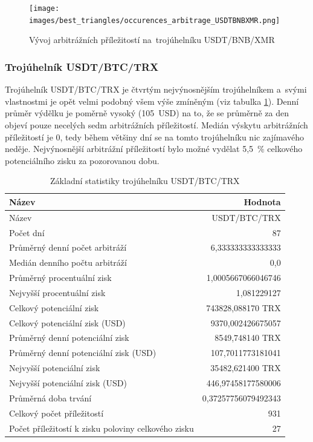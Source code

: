 \documentclass[thesis=B,czech]{FITthesis}[2019/03/21]
\begin{document}
\begin{figure}\centering
	\texttt{[image: images/best\_triangles/occurences\_arbitrage\_USDTBNBXMR.png]}
	\caption{Vývoj arbitrážních příležitostí na~trojúhelníku USDT/BNB/XMR }\label{occurences_arbitrage_USDTBNBXMR}
\end{figure}

\subsubsection{Trojúhelník USDT/BTC/TRX}
Trojúhelník USDT/BTC/TRX je čtvrtým nejvýnosnějším trojúhelníkem \linebreak a~svými vlastnostmi je opět velmi podobný všem výše zmíněným (viz tabulka \ref{USDTBTCTRX_stats}). Denní průměr výdělku je poměrně vysoký (105~USD) na to, že se průměrně za den objeví pouze necelých sedm arbitrážních příležitostí. Medián výskytu arbitrážních příležitostí je 0, tedy během většiny dní se na tomto trojúhelníku nic zajímavého neděje. Nejvýnosnější arbitrážní příležitostí bylo možné vydělat 5,5~\% celkového potenciálního zisku za pozorovanou dobu. 

\begin{table}\centering
\caption{Základní statistiky trojúhelníku USDT/BTC/TRX}
\label{USDTBTCTRX_stats}
\begin{tabular}{|| l | r ||}
\hline Název & Hodnota \\ 
\hline\hline Název & USDT/BTC/TRX \\ 
\hline Počet dní & 87 \\ 
\hline Průměrný denní počet arbitráží & 6,333333333333333 \\ 
\hline Medián denního počtu arbitráží & 0,0 \\ 
\hline Průměrný procentuální zisk & 1,0005667066046746 \\ 
\hline Nejvyšší procentuální zisk & 1,081229127 \\ 
\hline Celkový potenciální zisk & 743828,088170 TRX \\ 
\hline Celkový potenciální zisk (USD) & 9370,002426675057 \\ 
\hline Průměrný denní potenciální zisk & 8549,748140 TRX \\ 
\hline Průměrný denní potenciální zisk (USD) & 107,7011773181041 \\ 
\hline Nejvyšší potenciální zisk & 35482,621400 TRX \\ 
\hline Nejvyšší potenciální zisk (USD) & 446,97458177580006 \\ 
\hline Průměrná doba trvání & 0,37257756079492343 \\ 
\hline Celkový počet příležitostí & 931 \\ 
\hline Počet příležitostí k zisku poloviny celkového zisku & 27 \\ 
\hline
\end{tabular}
\end{table}
\end{document}
